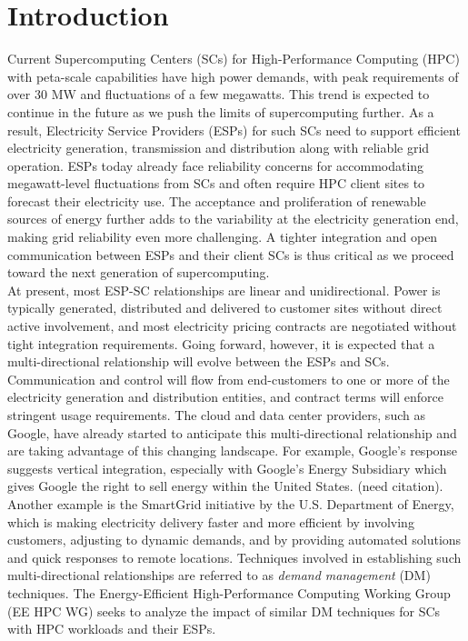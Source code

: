 \section{Introduction}

Current Supercomputing Centers (SCs) for High-Performance Computing (HPC) with peta-scale capabilities have high power demands, with peak requirements of over 30 MW and fluctuations of a few megawatts. This trend is expected to continue in the future as we push the limits of supercomputing further. As a result, Electricity Service Providers (ESPs) for such SCs need to support efficient electricity generation, transmission and distribution along with reliable grid operation. ESPs today already face reliability concerns for accommodating megawatt-level fluctuations from SCs and often require HPC client sites to forecast their electricity use. The acceptance and proliferation of renewable sources of energy further adds to the variability at the electricity generation end, making grid reliability even more challenging. A tighter integration and open communication between ESPs and their client SCs is thus critical as we proceed toward the next generation of supercomputing. \\

At present, most ESP-SC relationships are linear and unidirectional. Power is typically generated, distributed and delivered to customer sites without direct active involvement, and most electricity pricing contracts are negotiated without tight integration requirements. Going forward, however, it is expected that a multi-directional relationship will evolve between the ESPs and SCs.  Communication and control will flow from end-customers to one or more of the electricity generation and distribution entities, and contract terms will enforce stringent usage requirements. The cloud and data center providers, such as Google, have already started to anticipate this multi-directional relationship and are taking advantage of this changing landscape.  For example, Google's response suggests vertical integration, especially with Google's Energy Subsidiary which gives Google the right to sell energy within the United States. (need citation). Another example is the SmartGrid initiative \cite{SmartGrid} by the U.S. Department of Energy, which is making electricity delivery faster and more efficient by involving customers, adjusting to dynamic demands, and by providing automated solutions and quick responses to remote locations. Techniques involved in establishing such multi-directional relationships are referred to as \emph{demand management} (DM) techniques. The Energy-Efficient High-Performance Computing Working Group (EE HPC WG) seeks to analyze the impact of similar DM techniques for SCs with HPC workloads and their ESPs. \\

